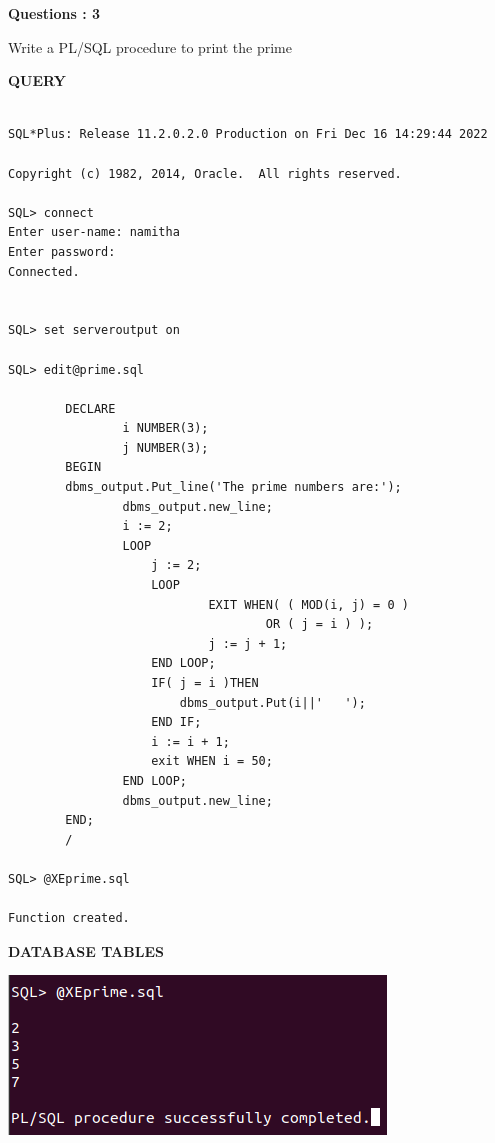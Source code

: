 \documentclass[a4paper,12pt]{report}
\begin{document}
\begin{flushleft}
    \textbf{Questions : 3}
\end{flushleft}
Write a PL/SQL procedure to print the prime 
	\begin{flushleft}
		\textbf{QUERY }
	\end{flushleft}
 \begin{verbatim}
 
SQL*Plus: Release 11.2.0.2.0 Production on Fri Dec 16 14:29:44 2022

Copyright (c) 1982, 2014, Oracle.  All rights reserved.

SQL> connect
Enter user-name: namitha
Enter password:
Connected.


SQL> set serveroutput on

SQL> edit@prime.sql

		DECLARE
    			i NUMBER(3);
    			j NUMBER(3);
		BEGIN
		dbms_output.Put_line('The prime numbers are:');
				dbms_output.new_line;
    			i := 2;
    			LOOP
        			j := 2;
        			LOOP
            				EXIT WHEN( ( MOD(i, j) = 0 )
                        			OR ( j = i ) );
            				j := j + 1;
        			END LOOP;
        			IF( j = i )THEN
         				dbms_output.Put(i||'   ');		   
        			END IF;
        			i := i + 1;
        			exit WHEN i = 50;
    			END LOOP;
				dbms_output.new_line;
		END;
		/
		
SQL> @XEprime.sql

Function created.

\end{verbatim}
\begin{flushleft}
		\textbf{DATABASE TABLES} 
\end{flushleft} 

\includegraphics[scale=0.7]{PRIME.png}
\end{document}
